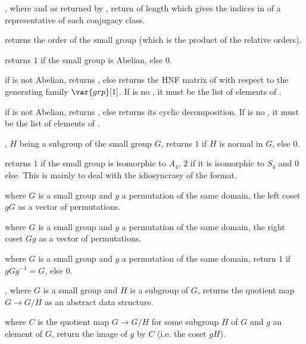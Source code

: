 ,
where  and  as returned by ,
return  of length  which gives the indices in 
of a representative of each conjugacy class.

 returns the order of the small group
 (which is the product of the relative orders).

 returns $1$ if the small group
 is Abelian, else $0$.

 if  is not Abelian,
returns , else returns the HNF matrix of  with respect to
the generating family $\var{grp}[1]$. If  is no , it must
be the list of elements of .

 if  is not Abelian,
returns , else returns its cyclic decomposition. If  is no
, it must be the list of elements of .

, $H$ being a subgroup of the
small group $G$, returns $1$ if $H$ is normal in $G$, else $0$.

 returns $1$ if the small group
 is isomorphic to $A_4$, $2$ if it is isomorphic to $S_4$ and
$0$ else. This is mainly to deal with the idiosyncrasy of the format.

 where $G$ is a small group and $g$ a
permutation of the same domain, the left coset $gG$ as a vector of
permutations.

 where $G$ is a small group and $g$ a
permutation of the same domain, the right coset $Gg$  as a vector of
permutations.

 where $G$ is a small group and
$g$ a permutation of the same domain, return $1$ if $gGg^{-1}=G$, else $0$.

, where $G$ is a small group and
$H$ is a subgroup of $G$, returns the quotient map $G\rightarrow G/H$
as an abstract data structure.

 where $C$ is the quotient map
$G\rightarrow G/H$ for some subgroup $H$ of $G$ and $g$ an element of $G$,
return the image of $g$ by $C$ (i.e. the coset $gH$).

